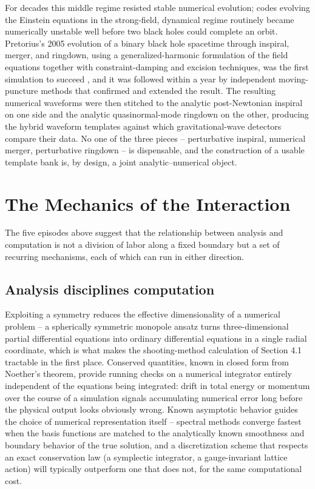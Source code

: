 \documentclass[11pt]{article}
\begin{document}
For decades this middle regime resisted stable numerical evolution; codes evolving the Einstein equations in the strong-field, dynamical regime routinely became numerically unstable well before two black holes could complete an orbit. Pretorius's 2005 evolution of a binary black hole spacetime through inspiral, merger, and ringdown, using a generalized-harmonic formulation of the field equations together with constraint-damping and excision techniques, was the first simulation to succeed \cite{Pretorius2005}, and it was followed within a year by independent moving-puncture methods that confirmed and extended the result. The resulting numerical waveforms were then stitched to the analytic post-Newtonian inspiral on one side and the analytic quasinormal-mode ringdown on the other, producing the hybrid waveform templates against which gravitational-wave detectors compare their data. No one of the three pieces -- perturbative inspiral, numerical merger, perturbative ringdown -- is dispensable, and the construction of a usable template bank is, by design, a joint analytic--numerical object.

\section{The Mechanics of the Interaction}

The five episodes above suggest that the relationship between analysis and computation is not a division of labor along a fixed boundary but a set of recurring mechanisms, each of which can run in either direction.

\subsection{Analysis disciplines computation}

Exploiting a symmetry reduces the effective dimensionality of a numerical problem -- a spherically symmetric monopole ansatz turns three-dimensional partial differential equations into ordinary differential equations in a single radial coordinate, which is what makes the shooting-method calculation of Section 4.1 tractable in the first place. Conserved quantities, known in closed form from Noether's theorem, provide running checks on a numerical integrator entirely independent of the equations being integrated: drift in total energy or momentum over the course of a simulation signals accumulating numerical error long before the physical output looks obviously wrong. Known asymptotic behavior guides the choice of numerical representation itself -- spectral methods converge fastest when the basis functions are matched to the analytically known smoothness and boundary behavior of the true solution, and a discretization scheme that respects an exact conservation law (a symplectic integrator, a gauge-invariant lattice action) will typically outperform one that does not, for the same computational cost.
\end{document}

